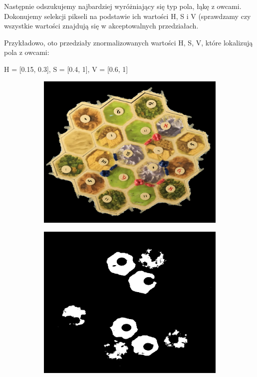 \documentclass[a4paper]{article}
\begin{document}
    Następnie odszukujemy najbardziej wyróżniający się typ pola, łąkę z owcami. Dokonujemy selekcji pikseli na podstawie ich wartości H, S i V (sprawdzamy czy wszystkie wartości znajdują się w akceptowalnych przedziałach. 
    
    Przykładowo, oto przedziały znormalizowanych wartości H, S, V, które lokalizują pola z owcami:
    
H = [0.15, 0.3], S = [0.4, 1], V = [0.6, 1] 
	
	\begin{figure}[H]
		
        \begin{subfigure}[]{.5\linewidth}
        \includegraphics[width=\linewidth]{pictures/fields/pre_mask.png}
        \end{subfigure}
        \begin{subfigure}[]{0.5\linewidth}
        \includegraphics[width=\linewidth]{pictures/fields/after_mask.png}

\end{subfigure}
\end{figure}
\end{document}
